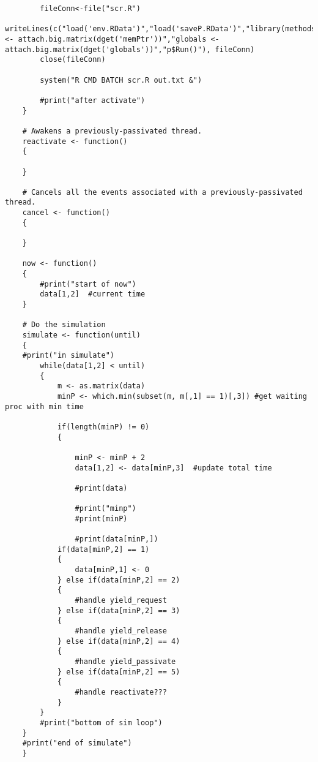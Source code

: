 \documentclass[titlepage]{article}
\begin{document}
\begin{verbatim}
        fileConn<-file("scr.R")
        writeLines(c("load('env.RData')","load('saveP.RData')","library(methods)","library(bigmemory)","data <- attach.big.matrix(dget('memPtr'))","globals <- attach.big.matrix(dget('globals'))","p$Run()"), fileConn)
        close(fileConn)

        system("R CMD BATCH scr.R out.txt &")

        #print("after activate")
    }

    # Awakens a previously-passivated thread.
    reactivate <- function()
    {

    }

    # Cancels all the events associated with a previously-passivated thread.
    cancel <- function()
    {

    }

    now <- function()
    {
        #print("start of now")
        data[1,2]  #current time
    }

    # Do the simulation
    simulate <- function(until)
    {
    #print("in simulate")
        while(data[1,2] < until)
        {
            m <- as.matrix(data)
            minP <- which.min(subset(m, m[,1] == 1)[,3]) #get waiting proc with min time

            if(length(minP) != 0)
            {

                minP <- minP + 2
                data[1,2] <- data[minP,3]  #update total time

                #print(data)

                #print("minp")
                #print(minP)

                #print(data[minP,])
            if(data[minP,2] == 1)
            {
                data[minP,1] <- 0
            } else if(data[minP,2] == 2)
            {
                #handle yield_request
            } else if(data[minP,2] == 3)
            {
                #handle yield_release
            } else if(data[minP,2] == 4)
            {
                #handle yield_passivate
            } else if(data[minP,2] == 5)
            {
                #handle reactivate???
            }
        }
        #print("bottom of sim loop")
    }
    #print("end of simulate")
    }

\end{verbatim}

\clearpage
\end{document}
